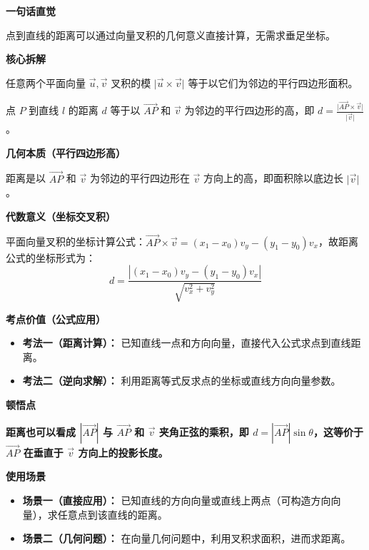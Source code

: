\begin{explanationbox}
	\textbf{\textcolor{CExplanation}{一句话直觉}}

	点到直线的距离可以通过向量叉积的几何意义直接计算，无需求垂足坐标。

	\medskip
	\textbf{\textcolor{CExplanation}{核心拆解}}
	\begin{description}[style=nextline, leftmargin=2.8em, labelsep=0.5em, itemsep=0.45em]
		\item[\textbf{要点一（叉积几何意义）：}] 任意两个平面向量 $\vec{u},\vec{v}$ 叉积的模 $\lvert\vec{u}\times\vec{v}\rvert$ 等于以它们为邻边的平行四边形面积。
		\item[\textbf{要点二（高与面积关系）：}] 点 $P$ 到直线 $l$ 的距离 $d$ 等于以 $\vec{AP}$ 和 $\vec{v}$ 为邻边的平行四边形的高，即 $d = \frac{\lvert\vec{AP}\times\vec{v}\rvert}{\lvert\vec{v}\rvert}$。
	\end{description}

	\medskip
	\textbf{\textcolor{CExplanation}{几何本质（平行四边形高）}}

	距离是以 $\vec{AP}$ 和 $\vec{v}$ 为邻边的平行四边形在 $\vec{v}$ 方向上的高，即面积除以底边长 $\lvert\vec{v}\rvert$。

	\medskip
	\textbf{\textcolor{CExplanation}{代数意义（坐标交叉积）}}

	平面向量叉积的坐标计算公式：$\vec{AP}\times\vec{v} = (x_1-x_0)v_y - (y_1-y_0)v_x$，故距离公式的坐标形式为：
	\[
		d = \frac{|(x_1-x_0)v_y - (y_1-y_0)v_x|}{\sqrt{v_x^2+v_y^2}}
	\]

	\medskip
	\textbf{\textcolor{CExplanation}{考点价值（公式应用）}}
	\begin{itemize}[leftmargin=*, itemsep=0.5em, topsep=0.4em]
		\item \textbf{考法一（距离计算）：} 已知直线一点和方向向量，直接代入公式求点到直线距离。
		\item \textbf{考法二（逆向求解）：} 利用距离等式反求点的坐标或直线方向向量参数。
	\end{itemize}

	\medskip
	\textbf{\textcolor{CExplanation}{顿悟点}}

	\textbf{距离也可以看成 $|\vec{AP}|$ 与 $\vec{AP}$ 和 $\vec{v}$ 夹角正弦的乘积，即 $d = |\vec{AP}|\sin\theta$，这等价于 $\vec{AP}$ 在垂直于 $\vec{v}$ 方向上的投影长度。}

	\medskip
	\textbf{\textcolor{CExplanation}{使用场景}}
	\begin{itemize}[leftmargin=*, itemsep=0.5em, topsep=0.4em]
		\item \textbf{场景一（直接应用）：} 已知直线的方向向量或直线上两点（可构造方向向量），求任意点到该直线的距离。
		\item \textbf{场景二（几何问题）：} 在向量几何问题中，利用叉积求面积，进而求距离。
	\end{itemize}
\end{explanationbox}
